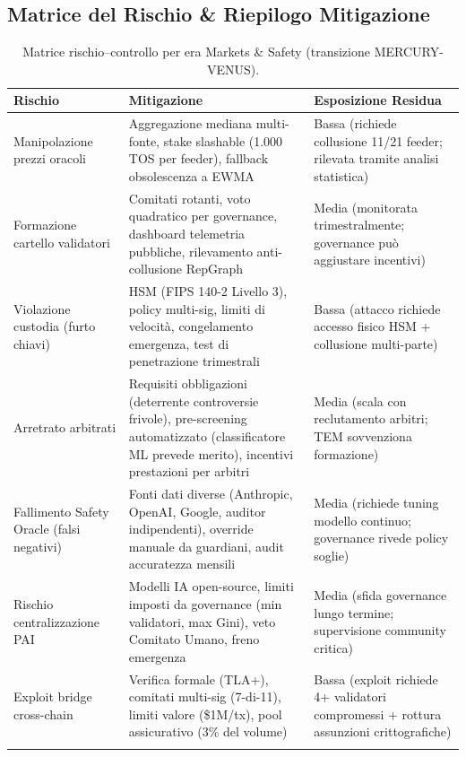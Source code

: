 \documentclass[11pt]{article}
\begin{document}
\subsection{Matrice del Rischio \& Riepilogo Mitigazione}
\begin{longtable}{@{}p{}p{}p{}@{}}
\toprule
\textbf{Rischio} & \textbf{Mitigazione} & \textbf{Esposizione Residua} \\\midrule
Manipolazione prezzi oracoli & Aggregazione mediana multi-fonte, stake slashable (1.000 TOS per feeder), fallback obsolescenza a EWMA & Bassa (richiede collusione 11/21 feeder; rilevata tramite analisi statistica) \\
Formazione cartello validatori & Comitati rotanti, voto quadratico per governance, dashboard telemetria pubbliche, rilevamento anti-collusione RepGraph & Media (monitorata trimestralmente; governance può aggiustare incentivi) \\
Violazione custodia (furto chiavi) & HSM (FIPS 140-2 Livello 3), policy multi-sig, limiti di velocità, congelamento emergenza, test di penetrazione trimestrali & Bassa (attacco richiede accesso fisico HSM + collusione multi-parte) \\
Arretrato arbitrati & Requisiti obbligazioni (deterrente controversie frivole), pre-screening automatizzato (classificatore ML prevede merito), incentivi prestazioni per arbitri & Media (scala con reclutamento arbitri; TEM sovvenziona formazione) \\
Fallimento Safety Oracle (falsi negativi) & Fonti dati diverse (Anthropic, OpenAI, Google, auditor indipendenti), override manuale da guardiani, audit accuratezza mensili & Media (richiede tuning modello continuo; governance rivede policy soglie) \\
Rischio centralizzazione PAI & Modelli IA open-source, limiti imposti da governance (min validatori, max Gini), veto Comitato Umano, freno emergenza & Media (sfida governance lungo termine; supervisione community critica) \\
Exploit bridge cross-chain & Verifica formale (TLA+), comitati multi-sig (7-di-11), limiti valore (\$1M/tx), pool assicurativo (3\% del volume) & Bassa (exploit richiede 4+ validatori compromessi + rottura assunzioni crittografiche) \\\bottomrule
\caption{Matrice rischio--controllo per era Markets \& Safety (transizione MERCURY-VENUS).}
\label{tab:risk-markets-expanded}
\end{longtable}
\end{document}
